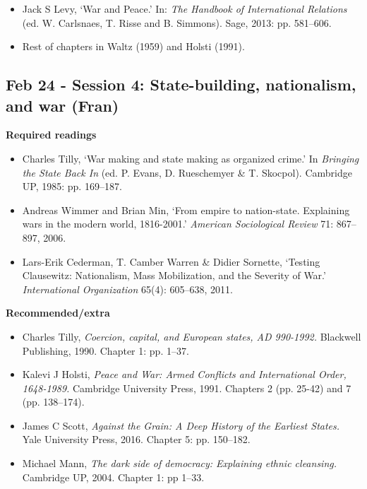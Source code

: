 \documentclass[12pt, a4paper]{article}
\begin{document}
\begin{itemize}
  \item Jack S Levy, `War and Peace.' In: \textit{The Handbook of International Relations} (ed. W. Carlsnaes, T. Risse and B. Simmons). Sage, 2013: pp. 581--606.
  \item Rest of chapters in Waltz (1959) and Holsti (1991).
\end{itemize}

\subsection*{Feb 24 - Session 4: State-building, nationalism, and war (Fran)}

\noindent \textbf{Required readings}

\begin{itemize}
  \item Charles Tilly, `War making and state making as organized crime.' In \textit{Bringing the State Back In} (ed. P. Evans, D. Rueschemyer \& T. Skocpol). Cambridge UP, 1985: pp. 169--187.
  \item Andreas Wimmer and Brian Min, `From empire to nation-state. Explaining wars in the modern world, 1816-2001.' \textit{American Sociological Review} 71: 867--897, 2006.
  \item Lars-Erik Cederman, T. Camber Warren \& Didier Sornette, `Testing Clausewitz: Nationalism, Mass Mobilization, and the Severity of War.' \textit{International Organization} 65(4): 605--638, 2011.
\end{itemize}

\noindent \textbf{Recommended/extra}

\begin{itemize}
  \item Charles Tilly, \textit{Coercion, capital, and European states, AD 990-1992.} Blackwell Publishing, 1990. Chapter 1: pp. 1--37.
  \item Kalevi J Holsti, \textit{Peace and War: Armed Conflicts and International Order, 1648-1989.} Cambridge University Press, 1991. Chapters 2 (pp. 25-42) and 7 (pp. 138--174).
  \item James C Scott, \textit{Against the Grain: A Deep History of the Earliest States.} Yale University Press, 2016. Chapter 5: pp. 150--182.
  \item Michael Mann, \textit{The dark side of democracy: Explaining ethnic cleansing.} Cambridge UP, 2004. Chapter 1: pp 1--33.
\end{itemize}
\end{document}
